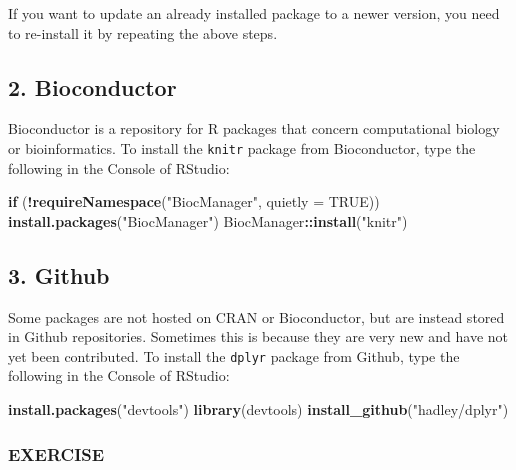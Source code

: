 \documentclass[]{book}
\newenvironment{Shaded}{\begin{snugshade}}{\end{snugshade}}
\newcommand{\ControlFlowTok}[1]{\textcolor[rgb]{0.13,0.29,0.53}{\textbf{#1}}}
\newcommand{\DataTypeTok}[1]{\textcolor[rgb]{0.13,0.29,0.53}{#1}}
\newcommand{\KeywordTok}[1]{\textcolor[rgb]{0.13,0.29,0.53}{\textbf{#1}}}
\newcommand{\NormalTok}[1]{#1}
\newcommand{\OperatorTok}[1]{\textcolor[rgb]{0.81,0.36,0.00}{\textbf{#1}}}
\newcommand{\OtherTok}[1]{\textcolor[rgb]{0.56,0.35,0.01}{#1}}
\newcommand{\StringTok}[1]{\textcolor[rgb]{0.31,0.60,0.02}{#1}}
\begin{document}
If you want to update an already installed package to a newer version, you need to re-install it by repeating the above steps.

\hypertarget{bioconductor}{%
\subsection*{2. Bioconductor}\label{bioconductor}}

Bioconductor is a repository for R packages that concern computational biology or bioinformatics. To install the \texttt{knitr} package from Bioconductor, type the following in the Console of RStudio:

\begin{Shaded}
\begin{Highlighting}[]
\ControlFlowTok{if}\NormalTok{ (}\OperatorTok{!}\KeywordTok{requireNamespace}\NormalTok{(}\StringTok{"BiocManager"}\NormalTok{, }\DataTypeTok{quietly =} \OtherTok{TRUE}\NormalTok{))}
    \KeywordTok{install.packages}\NormalTok{(}\StringTok{"BiocManager"}\NormalTok{)}
\NormalTok{BiocManager}\OperatorTok{::}\KeywordTok{install}\NormalTok{(}\StringTok{"knitr"}\NormalTok{)}
\end{Highlighting}
\end{Shaded}

\hypertarget{github}{%
\subsection*{3. Github}\label{github}}

Some packages are not hosted on CRAN or Bioconductor, but are instead stored in Github repositories. Sometimes this is because they are very new and have not yet been contributed. To install the \texttt{dplyr} package from Github, type the following in the Console of RStudio:

\begin{Shaded}
\begin{Highlighting}[]
\KeywordTok{install.packages}\NormalTok{(}\StringTok{"devtools"}\NormalTok{)}
\KeywordTok{library}\NormalTok{(devtools)}
\KeywordTok{install_github}\NormalTok{(}\StringTok{"hadley/dplyr"}\NormalTok{)}
\end{Highlighting}
\end{Shaded}

\hypertarget{exercise-2}{%
\subsubsection*{EXERCISE}\label{exercise-2}}
\end{document}
